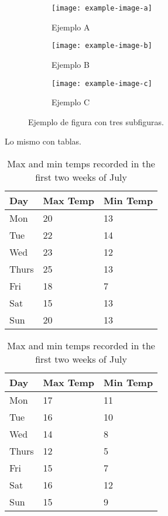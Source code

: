 \documentclass [15pt,a4paper]{article}
\begin{document}
\begin{figure}[H]
     \centering
     \begin{subfigure}[b]{0.3\textwidth}
         \centering
         \texttt{[image: example-image-a]}
         \caption{Ejemplo A}
         \label{fig:ejA}
     \end{subfigure}
     \hfill
     \begin{subfigure}[b]{0.3\textwidth}
         \centering
         \texttt{[image: example-image-b]}
         \caption{Ejemplo B}
         \label{fig:ejB}
     \end{subfigure}     
     \hfill
     \begin{subfigure}[b]{0.3\textwidth}
         \centering
         \texttt{[image: example-image-c]}
         \caption{Ejemplo C}
         \label{fig:EjC}
     \end{subfigure}
        \caption{Ejemplo de figura con tres subfiguras.}
        \label{fig:ej3figs}
\end{figure}

Lo mismo con tablas.

\begin{table}[H]
    \begin{subtable}[h]{0.45\textwidth}
        \centering
        \begin{tabular}{l | l | l}
        Day & Max Temp & Min Temp \\
        \hline \hline
        Mon & 20 & 13\\
        Tue & 22 & 14\\
        Wed & 23 & 12\\
        Thurs & 25 & 13\\
        Fri & 18 & 7\\
        Sat & 15 & 13\\
        Sun & 20 & 13
       \end{tabular}
       \caption{First Week}
       \label{tab:week1}
    \end{subtable}
    \hfill
    \begin{subtable}[h]{0.45\textwidth}
        \centering
        \begin{tabular}{l | l | l}
        Day & Max Temp & Min Temp \\
        \hline \hline
        Mon & 17 & 11\\
        Tue & 16 & 10\\
        Wed & 14 & 8\\
        Thurs & 12 & 5\\
        Fri & 15 & 7\\
        Sat & 16 & 12\\
        Sun & 15 & 9
        \end{tabular}
        \caption{Second Week}
        \label{tab:week2}
     \end{subtable}
     \caption{Max and min temps recorded in the first two weeks of July}
     \label{tab:temps}
\end{table}
\end{document}
